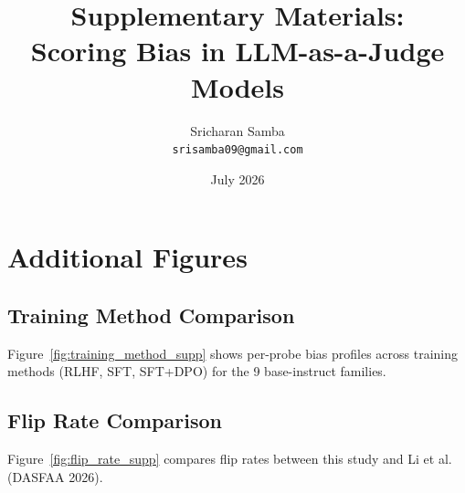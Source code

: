 \documentclass[11pt,twocolumn]{article}
\title{Supplementary Materials:\\Scoring Bias in LLM-as-a-Judge Models}
\author{Sricharan Samba \\ \texttt{srisamba09@gmail.com}}
\date{July 2026}
\begin{document}
\maketitle
\thispagestyle{fancy}

\tableofcontents
\newpage










\section{Additional Figures}
\label{app:additional_figures}

\subsection{Training Method Comparison}
\label{app:training_method}
Figure~\ref{fig:training_method_supp} shows per-probe bias profiles across training methods (RLHF, SFT, SFT+DPO) for the 9 base-instruct families.


\subsection{Flip Rate Comparison}
\label{app:flip_rate}
Figure~\ref{fig:flip_rate_supp} compares flip rates between this study and Li et al. (DASFAA 2026).

\end{document}
